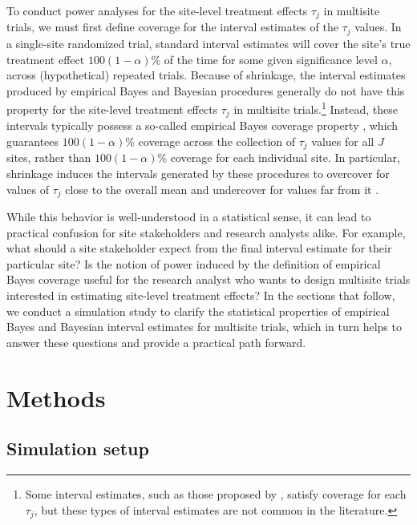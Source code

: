 \documentclass[]{article}
\begin{document}
To conduct power analyses for the site-level treatment effects $\tau_j$ in multisite trials, we must first define coverage for the interval estimates of the $\tau_j$ values.
In a single-site randomized trial, standard interval estimates will cover the site's true treatment effect $100(1-\alpha)$\% of the time for some given significance level $\alpha$, across (hypothetical) repeated trials.
Because of shrinkage, the interval estimates produced by empirical Bayes and Bayesian procedures generally do not have this property for the site-level treatment effects $\tau_j$ in multisite trials.\footnote{Some interval estimates, such as those proposed by \citet{yu2018adaptive}, satisfy coverage for each $\tau_j$, but these types of interval estimates are not common in the literature.}
Instead, these intervals typically possess a so-called empirical Bayes coverage property \citep{morris1983parametric}, which guarantees $100(1-\alpha)$\% coverage across the collection of $\tau_j$ values for all $J$ sites, rather than $100(1-\alpha)$\% coverage for each individual site.
In particular, shrinkage induces the intervals generated by these procedures to overcover for values of $\tau_j$ close to the overall mean and undercover for values far from it \citep{snijders2011multilevel}.

While this behavior is well-understood in a statistical sense, it can lead to practical confusion for site stakeholders and research analysts alike.
For example, what should a site stakeholder expect from the final interval estimate for their particular site?
Is the notion of power induced by the definition of empirical Bayes coverage useful for the research analyst who wants to design multisite trials interested in estimating site-level treatment effects?
In the sections that follow, we conduct a simulation study to clarify the statistical properties of empirical Bayes and Bayesian interval estimates for multisite trials, which in turn helps to answer these questions and provide a practical path forward.


\section{Methods}

\subsection{Simulation setup}
\end{document}
